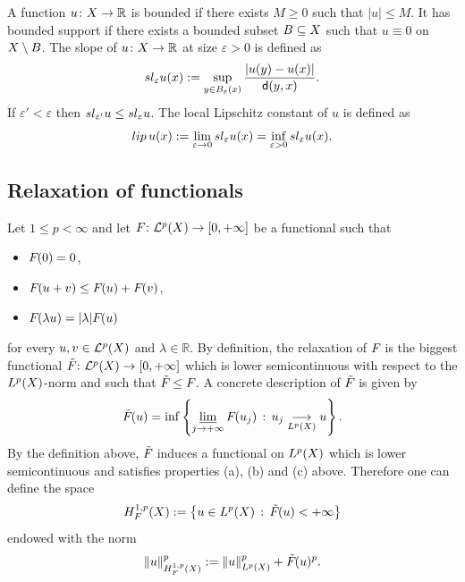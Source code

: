 \documentclass[12pt]{amsart}
\newcommand{\R}{\mathbb{R}}
\newcommand{\sfd}{{\sf d}}
\newcommand{\limi}{\varliminf}
\newcommand{\X}{{\rm X}}
\newcommand{\lip}{{\rm lip}}
\newcommand{\F}{{\rm F}}
\theoremstyle{definition}
\renewcommand{\sl}[1]{{\rm sl}_{#1}}
\newcommand{\calL}[1]{\mathcal{L}^{#1}}
\newcommand{\HH}[2]{H^{1,#1}_{{\rm #2}}}
\renewcommand{\F}[1]{{\rm F}_{{\rm #1}}}
\newcommand{\relF}[1]{\tilde{\rm F}_{{\rm #1}}}
\begin{document}
A function $u\colon \X \to \R$ is bounded if there exists $M \ge 0$ such that $\vert u \vert \le M$. It has bounded support if there exists a bounded subset $B\subseteq \X$ such that $u\equiv 0$ on $\X \setminus B$. The slope of $u\colon \X \to \mathbb{R}$ at size $\varepsilon > 0$ is defined as
\begin{equation*}
    \sl{\varepsilon} u(x):=\sup_{y \in B_\varepsilon(x)}\frac{|u(y)-u(x)|}{\sfd(y,x)}.
\end{equation*}
If $\varepsilon' < \varepsilon$ then $\sl{\varepsilon'}u \le \sl{\varepsilon} u$. The local Lipschitz constant of $u$ is defined as 
$$\lip\, u(x):=\lim_{\varepsilon \to 0} \sl{\varepsilon} u(x)= \inf_{\varepsilon > 0} \sl{\varepsilon} u(x).$$

\subsection{Relaxation of functionals}
\label{subsec:relaxation}
Let $1\le p < \infty$ and let $\F{}\colon \calL{p}(\X) \to [0,+\infty]$ be a functional such that 
\begin{itemize}
    \item[(a)] $\F{}(0) = 0$,
    \item[(b)] $\F{}(u+v) \le \F{}(u) + \F{}(v)$,
    \item[(c)] $\F{}(\lambda u) = \vert \lambda \vert \F{}(u)$
\end{itemize}
for every $u,v\in \calL{p}(\X)$ and $\lambda \in \R$. By definition, the relaxation of $\F{}$ is the biggest functional $\relF{} \colon \calL{p}(\X) \to [0,+\infty]$ which is lower semicontinuous with respect to the $L^p(\X)$-norm and such that $\relF{} \le \F{}$. A concrete description of $\relF{}$ is given by
\begin{equation}
    \label{eq:defin_relaxation_full_generality}
    \relF{}(u) = \inf\left\{ \limi_{j\to +\infty}\F{}(u_j)\, : \, u_j \underset{L^p(\X)}{\longrightarrow} u\right\}.
\end{equation}
By the definition above, $\relF{}$ induces a functional on $L^p(\X)$ which is lower semicontinuous and satisfies properties (a), (b) and (c) above. Therefore one can define the space
\begin{equation}
    \label{eq:defin_H_full_generality}
    \HH{p}{F}(\X) := \left\{ u \in L^p(\X)\,:\, \relF{}(u) < +\infty \right\}
\end{equation}
endowed with the norm
\begin{equation}
    \label{eq:defin_norm_H_full_generality}
    \Vert u \Vert_{\HH{p}{F}(\X)}^p := \Vert u \Vert_{L^p(\X)}^p + \relF{}(u)^p.
\end{equation}
\end{document}
